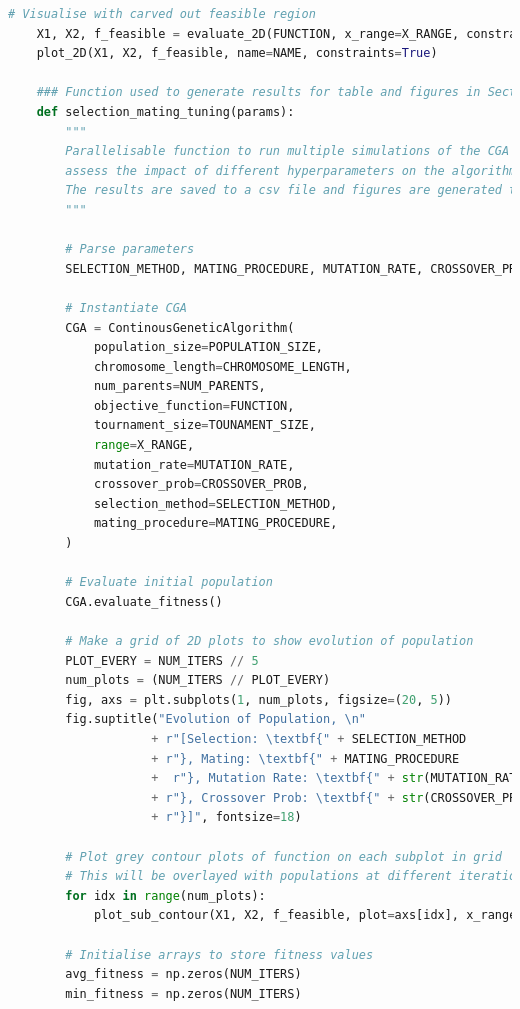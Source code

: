 \documentclass[10pt]{article}
\begin{document}
\begin{lstlisting}[language=Python, caption=CGA\_TuningExperiments.py, label=CGA_TuningExperimentspy]
    # Visualise with carved out feasible region
    X1, X2, f_feasible = evaluate_2D(FUNCTION, x_range=X_RANGE, constraints=True)
    plot_2D(X1, X2, f_feasible, name=NAME, constraints=True)
    
    ### Function used to generate results for table and figures in Section 3.2/Appendix of the report ###
    def selection_mating_tuning(params):
        """
        Parallelisable function to run multiple simulations of the CGA algorithm and 
        assess the impact of different hyperparameters on the algorithm's performance.
        The results are saved to a csv file and figures are generated to visualise the results.
        """
    
        # Parse parameters
        SELECTION_METHOD, MATING_PROCEDURE, MUTATION_RATE, CROSSOVER_PROB, NUM_ITERS = params
    
        # Instantiate CGA
        CGA = ContinousGeneticAlgorithm(
            population_size=POPULATION_SIZE,
            chromosome_length=CHROMOSOME_LENGTH,
            num_parents=NUM_PARENTS,
            objective_function=FUNCTION,
            tournament_size=TOUNAMENT_SIZE,
            range=X_RANGE,
            mutation_rate=MUTATION_RATE,
            crossover_prob=CROSSOVER_PROB,
            selection_method=SELECTION_METHOD,
            mating_procedure=MATING_PROCEDURE,
        )
    
        # Evaluate initial population
        CGA.evaluate_fitness()
    
        # Make a grid of 2D plots to show evolution of population
        PLOT_EVERY = NUM_ITERS // 5
        num_plots = (NUM_ITERS // PLOT_EVERY)
        fig, axs = plt.subplots(1, num_plots, figsize=(20, 5))
        fig.suptitle("Evolution of Population, \n" 
                    + r"[Selection: \textbf{" + SELECTION_METHOD 
                    + r"}, Mating: \textbf{" + MATING_PROCEDURE 
                    +  r"}, Mutation Rate: \textbf{" + str(MUTATION_RATE) 
                    + r"}, Crossover Prob: \textbf{" + str(CROSSOVER_PROB) 
                    + r"}]", fontsize=18)
    
        # Plot grey contour plots of function on each subplot in grid
        # This will be overlayed with populations at different iterations
        for idx in range(num_plots):
            plot_sub_contour(X1, X2, f_feasible, plot=axs[idx], x_range=X_RANGE)
    
        # Initialise arrays to store fitness values
        avg_fitness = np.zeros(NUM_ITERS)
        min_fitness = np.zeros(NUM_ITERS)
    

\end{lstlisting}
\end{document}
